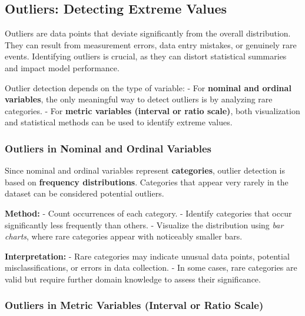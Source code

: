 \documentclass[12pt,openany]{book}
\begin{document}
\subsection{Outliers: Detecting Extreme Values}

Outliers are data points that deviate significantly from the overall 
distribution. They can result from measurement errors, data entry 
mistakes, or genuinely rare events. Identifying outliers is crucial, 
as they can distort statistical summaries and impact model performance.
\newline

Outlier detection depends on the type of variable:  
\newline
- For \textbf{nominal and ordinal variables}, the only meaningful way to detect 
  outliers is by analyzing rare categories.  
\newline
- For \textbf{metric variables (interval or ratio scale)}, both visualization and 
  statistical methods can be used to identify extreme values.
\newline

\subsubsection{Outliers in Nominal and Ordinal Variables}

Since nominal and ordinal variables represent \textbf{categories}, outlier detection 
is based on \textbf{frequency distributions}. Categories that appear very rarely in 
the dataset can be considered potential outliers.
\newline

\textbf{Method:}  
\newline
- Count occurrences of each category.  
- Identify categories that occur significantly less frequently than others.  
- Visualize the distribution using \textit{bar charts}, where rare categories 
  appear with noticeably smaller bars.
\newline

\textbf{Interpretation:}  
\newline
- Rare categories may indicate unusual data points, potential misclassifications, 
  or errors in data collection.  
- In some cases, rare categories are valid but require further domain knowledge 
  to assess their significance.  
\newline

\subsubsection{Outliers in Metric Variables (Interval or Ratio Scale)}
\end{document}
